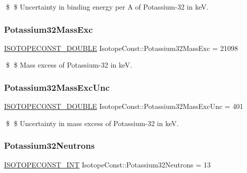 \$ \$ Uncertainty in binding energy per A of Potassium-\/32 in keV. \mbox{\label{group___isotope_const-_potassium-_k32_ga44f2b0654a5b6e2f0b947937051dd740}} 
\subsubsection{\texorpdfstring{Potassium32\+Mass\+Exc}{Potassium32MassExc}}
{\footnotesize\ttfamily \mbox{\hyperlink{group___isotope_const-_macros_ga8f45a7272ce02c0b4c65c44636ed719a}{I\+S\+O\+T\+O\+P\+E\+C\+O\+N\+S\+T\+\_\+\+D\+O\+U\+B\+LE}} Isotope\+Const\+::\+Potassium32\+Mass\+Exc = 21098}

\$ \$ Mass excess of Potassium-\/32 in keV. \mbox{\label{group___isotope_const-_potassium-_k32_ga588ff171ec502ca3435a0af4a3e657d5}} 
\subsubsection{\texorpdfstring{Potassium32\+Mass\+Exc\+Unc}{Potassium32MassExcUnc}}
{\footnotesize\ttfamily \mbox{\hyperlink{group___isotope_const-_macros_ga8f45a7272ce02c0b4c65c44636ed719a}{I\+S\+O\+T\+O\+P\+E\+C\+O\+N\+S\+T\+\_\+\+D\+O\+U\+B\+LE}} Isotope\+Const\+::\+Potassium32\+Mass\+Exc\+Unc = 401}

\$ \$ Uncertainty in mass excess of Potassium-\/32 in keV. \mbox{\label{group___isotope_const-_potassium-_k32_ga02ed4f197ee7f0475993310bfebe6afa}} 
\subsubsection{\texorpdfstring{Potassium32\+Neutrons}{Potassium32Neutrons}}
{\footnotesize\ttfamily \mbox{\hyperlink{group___isotope_const-_macros_ga5f18360b3e99483a35c32d789e62621c}{I\+S\+O\+T\+O\+P\+E\+C\+O\+N\+S\+T\+\_\+\+I\+NT}} Isotope\+Const\+::\+Potassium32\+Neutrons = 13}

